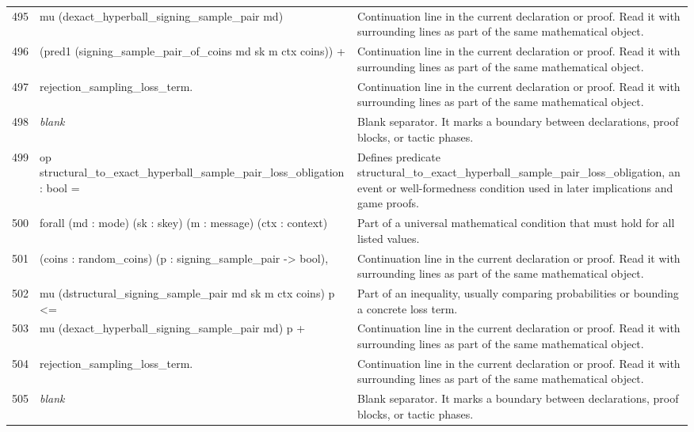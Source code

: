 \documentclass[10pt]{article}
\begin{document}
\begin{longtable}{r L{0.53\textwidth} L{0.37\textwidth}}
495 & {\ttfamily\scriptsize     mu (dexact\_hyperball\_signing\_sample\_pair md)} & Continuation line in the current declaration or proof.  Read it with surrounding lines as part of the same mathematical object. \\
496 & {\ttfamily\scriptsize       (pred1 (signing\_sample\_pair\_of\_coins md sk m ctx coins)) +} & Continuation line in the current declaration or proof.  Read it with surrounding lines as part of the same mathematical object. \\
497 & {\ttfamily\scriptsize       rejection\_sampling\_loss\_term.} & Continuation line in the current declaration or proof.  Read it with surrounding lines as part of the same mathematical object. \\
498 & {\ttfamily\scriptsize \emph{blank}} & Blank separator.  It marks a boundary between declarations, proof blocks, or tactic phases. \\
499 & {\ttfamily\scriptsize op structural\_to\_exact\_hyperball\_sample\_pair\_loss\_obligation : bool =} & Defines predicate structural\_to\_exact\_hyperball\_sample\_pair\_loss\_obligation, an event or well-formedness condition used in later implications and game proofs. \\
500 & {\ttfamily\scriptsize   forall (md : mode) (sk : skey) (m : message) (ctx : context)} & Part of a universal mathematical condition that must hold for all listed values. \\
501 & {\ttfamily\scriptsize          (coins : random\_coins) (p : signing\_sample\_pair -> bool),} & Continuation line in the current declaration or proof.  Read it with surrounding lines as part of the same mathematical object. \\
502 & {\ttfamily\scriptsize     mu (dstructural\_signing\_sample\_pair md sk m ctx coins) p <=} & Part of an inequality, usually comparing probabilities or bounding a concrete loss term. \\
503 & {\ttfamily\scriptsize     mu (dexact\_hyperball\_signing\_sample\_pair md) p +} & Continuation line in the current declaration or proof.  Read it with surrounding lines as part of the same mathematical object. \\
504 & {\ttfamily\scriptsize       rejection\_sampling\_loss\_term.} & Continuation line in the current declaration or proof.  Read it with surrounding lines as part of the same mathematical object. \\
505 & {\ttfamily\scriptsize \emph{blank}} & Blank separator.  It marks a boundary between declarations, proof blocks, or tactic phases. \\

\end{longtable}
\end{document}
